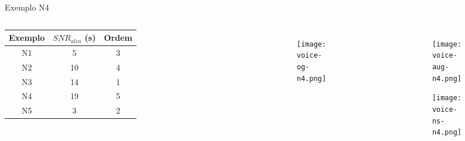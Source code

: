 \begin{frame}{Exemplo N4}
    \begin{columns}
    
        \begin{table} [H]
            \begin{adjustbox}{width=\columnwidth,center}
                \begin{tabular}{c|c|c}
            
                    \textbf{Exemplo} & 
                    \textbf{$SNR_{alvo}$ (s)} & 
                    \textbf{Ordem} \\
                    \hline 
            
                    N1 &  5 & 3 \\
                    N2 & 10 & 4 \\
                    N3 & 14 & 1 \\
                    N4 & 19 & 5 \\
                    N5 &  3 & 2 \\
            
                \end{tabular}
            \end{adjustbox}
        \end{table}
    
        \begin{figure}
            \begin{subfigure}{\textwidth}
                \centering
                \texttt{[image: voice-og-n4.png]}
            \end{subfigure}
        \end{figure}

        \begin{figure}
            \begin{subfigure}{\textwidth}
                \centering
                \texttt{[image: voice-aug-n4.png]}
            \end{subfigure}
            \begin{subfigure}{\textwidth}
                \centering
                \texttt{[image: voice-ns-n4.png]}
            \end{subfigure}
        \end{figure}
    \end{columns}
\end{frame}

